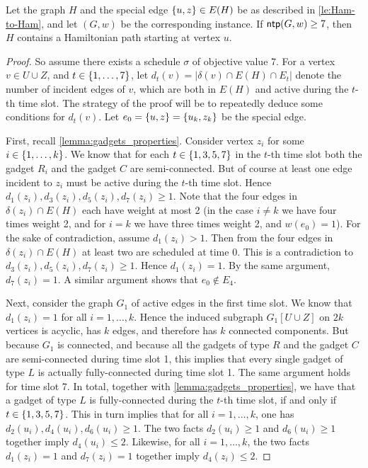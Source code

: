 \begin{lemma}
\label{lemma:lasse-only-if}
Let the graph $H$ and the special edge $\{ u,z \} \in E(H)$ be as described in \cref{le:Ham-to-Ham}, and let $(G, w)$ be the corresponding {\xxxNTP} instance. If $\operatorname{\textsf{ntp}}(G, w) \geq 7$, then $H$ contains a Hamiltonian path starting at vertex $u$.
\end{lemma}
\begin{proof}
So assume there exists a schedule $\sigma$ of objective value 7. 
For a vertex $v \in U \cup Z$, and $t \in \{ 1, \ldots, 7 \}$, let $d_t(v) = |\delta(v) \cap E(H) \cap E_t|$ denote the number of incident edges of $v$, which are both in $E(H)$ and active during the $t$-th time slot. The strategy of the proof will be to repeatedly deduce some conditions for $d_t(v)$. 
Let $e_0 = \{ u, z \} = \{ u_k, z_k \}$ be the special edge.

First, recall \cref{lemma:gadgets_properties}. Consider vertex $z_i$ for some $i \in \{ 1, \ldots, k \}$. We know that for each $t \in \{ 1, 3, 5, 7 \}$ in the $t$-th time slot both the gadget $R_i$ and the gadget $C$ are semi-connected. But of course at least one edge incident to $z_i$ must be active during the $t$-th time slot. Hence $d_1(z_i), d_3(z_i), d_5(z_i), d_7(z_i) \geq 1$.  Note that the four edges in $\delta(z_i) \cap E(H)$ each have weight at most 2 (in the case $i \neq k$ we have four times weight 2, and for $i = k$ we have three times weight 2, and $w(e_0) = 1$). For the sake of contradiction, assume $d_1(z_i) > 1$. Then from the four edges in $\delta(z_i) \cap E(H)$ at least two are scheduled at time $0$. This is a contradiction to  $d_3(z_i), d_5(z_i), d_7(z_i) \geq 1$. Hence $d_1(z_i) = 1$. By the same argument, $d_7(z_i) = 1$. A similar argument shows that $e_0 \not\in E_4$.

Next, consider the graph $G_1$ of active edges in the first time slot. We know that  $d_1(z_i) = 1$ for all $i= 1,\dots, k$. Hence the induced subgraph $G_1[U \cup Z]$ on $2k$ vertices is acyclic, has $k$ edges, and therefore has $k$ connected components. But because $G_1$ is connected, and because all the gadgets of type $R$ and the gadget $C$ are semi-connected during time slot 1, this implies that every single gadget of type $L$ is actually fully-connected during time slot 1. The same argument holds for time slot 7. In total, together with \cref{lemma:gadgets_properties}, we have that a gadget of type $L$ is fully-connected during the $t$-th time slot, if and only if $t \in \{ 1, 3, 5, 7 \}$. This in turn implies that for all $i = 1,\dots, k$, one has $d_2(u_i), d_4(u_i), d_6(u_i) \geq 1$. The two facts $d_2(u_i) \geq 1$ and $d_6(u_i) \geq 1$ together imply $d_4(u_i) \leq 2$. Likewise, for all $i = 1,\dots,k$, the two facts $d_1(z_i) = 1$ and $d_7(z_i) = 1$ together imply $d_4(z_i) \leq 2$.


\end{proof}
